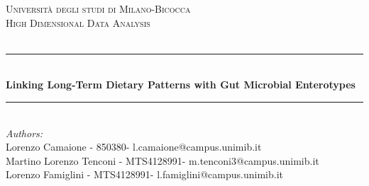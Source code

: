 \begin{titlepage}

\newcommand{\HRule}{\rule{\linewidth}{0.5mm}} %

\center %


\textsc{\LARGE Università degli studi di Milano-Bicocca}\\[1cm] %
\textsc{\Large High Dimensional Data Analysis}\\[0.3cm] %
\textsc{\large }\\[0.1cm] %


\HRule \\[0.4cm]
{ \huge \bfseries Linking Long-Term Dietary Patterns with Gut Microbial Enterotypes}\\[0.4cm] %
\HRule \\[1.5cm]
 

\large
\emph{Authors:}\\
Lorenzo Camaione - 850380- l.camaione@campus.unimib.it \\   %
Martino Lorenzo Tenconi - MTS4128991- m.tenconi3@campus.unimib.it \\  %
Lorenzo Famiglini - MTS4128991- l.famiglini@campus.unimib.it   \\[1cm] %




\end{titlepage}
